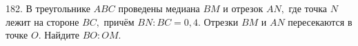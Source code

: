 182. В треугольнике $ABC$ проведены медиана $BM$ и отрезок $AN,$ где точка $N$ лежит на стороне $BC,$ причём $BN:BC=0,4.$ Отрезки $BM$ и $AN$ пересекаются в точке $O.$ Найдите $BO:OM.$\\

